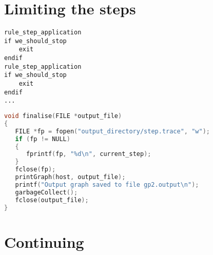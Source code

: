 \documentclass{UoYCSproject}
\begin{document}
% 

\section{Limiting the steps} %




\begin{lstlisting}[label=code:breakpoint_1, caption=Pseudocode of breakpoints]
rule_step_application
if we_should_stop
    exit
endif
rule_step_application
if we_should_stop
    exit
endif
...
\end{lstlisting}



\begin{lstlisting}[label=code:save_current_step, caption=Finalise step, language=C]
void finalise(FILE *output_file)
{
   FILE *fp = fopen("output_directory/step.trace", "w");
   if (fp != NULL)
   {
      fprintf(fp, "%d\n", current_step);
   }
   fclose(fp);
   printGraph(host, output_file);
   printf("Output graph saved to file gp2.output\n");
   garbageCollect();
   fclose(output_file);
}
\end{lstlisting}


\section{Continuing} %
\end{document}
